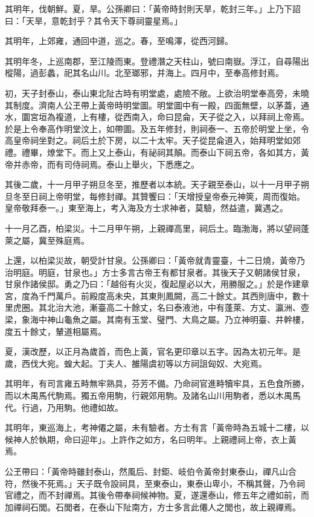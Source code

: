 \begin{pinyinscope}
其明年，伐朝鮮。夏，旱。公孫卿曰：「黃帝時封則天旱，乾封三年。」上乃下詔曰：「天旱，意乾封乎？其令天下尊祠靈星焉。」

其明年，上郊雍，通回中道，巡之。春，至鳴澤，從西河歸。

其明年冬，上巡南郡，至江陵而東。登禮潛之天柱山，號曰南嶽。浮江，自尋陽出樅陽，過彭蠡，祀其名山川。北至瑯邪，并海上。四月中，至奉高修封焉。

初，天子封泰山，泰山東北阯古時有明堂處，處險不敞。上欲治明堂奉高旁，未曉其制度。濟南人公玊帶上黃帝時明堂圖。明堂圖中有一殿，四面無壁，以茅蓋，通水，圜宮垣為複道，上有樓，從西南入，命曰昆侖，天子從之入，以拜祠上帝焉。於是上令奉高作明堂汶上，如帶圖。及五年修封，則祠泰一、五帝於明堂上坐，令高皇帝祠坐對之。祠后土於下房，以二十太牢。天子從昆侖道入，始拜明堂如郊禮。禮畢，燎堂下。而上又上泰山，有祕祠其顛。而泰山下祠五帝，各如其方，黃帝并赤帝，而有司侍祠焉。泰山上舉火，下悉應之。

其後二歲，十一月甲子朔旦冬至，推歷者以本統。天子親至泰山，以十一月甲子朔旦冬至日祠上帝明堂，每修封禪。其贊饗曰：「天增授皇帝泰元神筴，周而復始。皇帝敬拜泰一。」東至海上，考入海及方士求神者，莫驗，然益遣，冀遇之。

十一月乙酉，柏梁災。十二月甲午朔，上親禪高里，祠后土。臨渤海，將以望祠蓬萊之屬，冀至殊庭焉。

上還，以柏梁災故，朝受計甘泉。公孫卿曰：「黃帝就青靈臺，十二日燒，黃帝乃治明庭。明庭，甘泉也。」方士多言古帝王有都甘泉者。其後天子又朝諸侯甘泉，甘泉作諸侯邸。勇之乃曰：「越俗有火災，復起屋必以大，用勝服之。」於是作建章宮，度為千門萬戶。前殿度高未央，其東則鳳闕，高二十餘丈。其西則唐中，數十里虎圈。其北治大池，漸臺高二十餘丈，名曰泰液池，中有蓬萊、方丈、瀛洲、壺梁，象海中神山龜魚之屬。其南有玉堂、璧門、大鳥之屬。乃立神明臺、井幹樓，度五十餘丈，輦道相屬焉。

夏，漢改歷，以正月為歲首，而色上黃，官名更印章以五字。因為太初元年。是歲，西伐大宛。蝗大起。丁夫人、雒陽虞初等以方祠詛匈奴、大宛焉。

其明年，有司言雍五畤無牢熟具，芬芳不備。乃命祠官進畤犢牢具，五色食所勝，而以木禺馬代駒焉。獨五帝用駒，行親郊用駒。及諸名山川用駒者，悉以木禺馬代。行過，乃用駒。他禮如故。

其明年，東巡海上，考神僊之屬，未有驗者。方士有言「黃帝時為五城十二樓，以候神人於執期，命曰迎年」。上許作之如方，名曰明年。上親禮祠上帝，衣上黃焉。

公玊帶曰：「黃帝時雖封泰山，然風后、封鉅、岐伯令黃帝封東泰山，禪凡山合符，然後不死焉。」天子既令設祠具，至東泰山，東泰山卑小，不稱其聲，乃令祠官禮之，而不封禪焉。其後令帶奉祠候神物。夏，遂還泰山，修五年之禮如前，而加禪祠石閭。石閭者，在泰山下阯南方，方士多言此僊人之閭也，故上親禪焉。


\end{pinyinscope}

